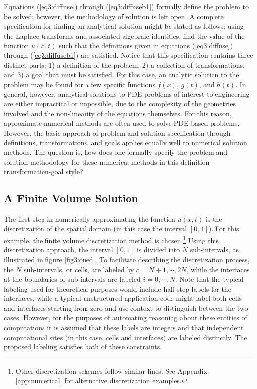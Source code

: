 \documentclass[10pt,epsf]{book}
\begin{document}
Equations (\ref{eq3:diffuse}) through (\ref{eq3:diffuseb1}) formally
define the problem to be solved; however, the methodology of solution
is left open.  A complete specification for finding an analytical
solution might be stated as follows: using the Laplace transforms and
associated algebraic identities, find the value of the function
$u(x,t)$ such that the definitions given in equations
(\ref{eq3:diffuse}) through (\ref{eq3:diffuseb1}) are satisfied.
Notice that this specification contains three distinct parts: 1) a
definition of the problem, 2) a collection of transformations, and 3)
a goal that must be satisfied.  For this case, an analytic solution to
the problem may be found for a few specific
functions $f(x)$, $g(t)$, and $h(t)$.  In general, however, analytical
solutions to PDE problems of interest to engineering are either
impractical or impossible, due to the complexity of the geometries
involved and the non-linearity of the equations themselves.  For this
reason, approximate numerical methods are often used to solve PDE
based problems.  However, the basic approach of problem and solution
specification through definitions, transformations, and goals 
applies equally well to numerical solution methods.  The question is,
how does one formally specify the problem and solution methodology for
these numerical methods in this definition-transformation-goal style?


\subsection{A Finite Volume Solution}

The first step in numerically approximating the function $u(x,t)$ is
the discretization of the spatial domain (in this case the interval
$[0,1]$).  For this example, the finite volume discretization method
is chosen.\footnote{Other discretization schemes follow similar lines.
  See Appendix \ref{app:numerical} for alternative discretization
  examples.} Using this discretization approach, the interval $[0,1]$
is divided into $N$ sub-intervals, as illustrated in figure
\ref{fig3:oned}.  To facilitate describing the discretization process,
the $N$ sub-intervals, or cells, are labeled by $c = N+1, \cdots, 2N$,
while the interfaces at the boundaries of sub-intervals are labeled $i
= 0, \cdots, N$.  Note that the typical labeling used for theoretical
purposes would include half step labels for the interfaces, while a
typical unstructured application code might label both cells and
interfaces starting from zero and use context to distinguish between
the two cases.  However, for the purposes of automating reasoning
about these entities of computations it is assumed that these labels
are integers and that independent computational sites (in this case,
cells and interfaces) are labeled distinctly.  The proposed labeling
satisfies both of these constraints.
\end{document}
